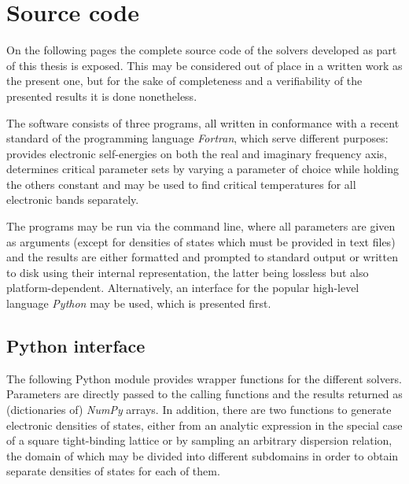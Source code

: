 
\def\path{ebmb}

\chapter{Source code}
\label{source code}

On the following pages the complete source code of the  solvers
developed as part of this thesis is exposed. This may be considered out of place
in a written work as the present one, but for the sake of completeness and a
verifiability of the presented results it is done nonetheless.

The software consists of three programs, all written in conformance with a
recent standard of the programming language \emph{Fortran}, which serve
different purposes:  provides electronic self-energies on both the
real and imaginary frequency axis,  determines critical parameter
sets by varying a parameter of choice while holding the others constant and
 may be used to find critical temperatures for all electronic bands
separately.

The programs may be run via the command line, where all parameters are given as
arguments (except for densities of states which must be provided in text files)
and the results are either formatted and prompted to standard output or written
to disk using their internal representation, the latter being lossless but also
platform-dependent. Alternatively, an interface for the popular high-level
language \emph{Python} may be used, which is presented first.

\section{Python interface}
\label{Python interface}

The following Python module provides wrapper functions for the different
 solvers. Parameters are directly passed to the calling
functions and the results returned as (dictionaries of) \emph{NumPy} arrays. In
addition, there are two functions to generate electronic densities of states,
either from an analytic expression in the special case of a square tight-binding
lattice or by sampling an arbitrary dispersion relation, the domain of which may
be divided into different subdomains in order to obtain separate densities of
states for each of them.



